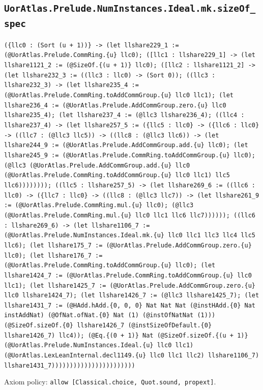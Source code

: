 \documentclass[11pt]{article}
\begin{document}
\subsection*{\texttt{UorAtlas.Prelude.NumInstances.Ideal.mk.sizeOf\_spec}}
\noindent\texttt{(\{llc0 : (Sort (u + 1))\} -> (let llshare229\_1 := (@UorAtlas.Prelude.CommRing.\{u\} llc0); ([llc1 : llshare229\_1] -> (let llshare1121\_2 := (@SizeOf.\{(u + 1)\} llc0); ([llc2 : llshare1121\_2] -> (let llshare232\_3 := ((llc3 : llc0) -> (Sort 0)); ((llc3 : llshare232\_3) -> (let llshare235\_4 := (@UorAtlas.Prelude.CommRing.toAddCommGroup.\{u\} llc0 llc1); (let llshare236\_4 := (@UorAtlas.Prelude.AddCommGroup.zero.\{u\} llc0 llshare235\_4); (let llshare237\_4 := (@llc3 llshare236\_4); ((llc4 : llshare237\_4) -> (let llshare257\_5 := (\{llc5 : llc0\} -> (\{llc6 : llc0\} -> ((llc7 : (@llc3 llc5)) -> ((llc8 : (@llc3 llc6)) -> (let llshare244\_9 := (@UorAtlas.Prelude.AddCommGroup.add.\{u\} llc0); (let llshare245\_9 := (@UorAtlas.Prelude.CommRing.toAddCommGroup.\{u\} llc0); (@llc3 (@UorAtlas.Prelude.AddCommGroup.add.\{u\} llc0 (@UorAtlas.Prelude.CommRing.toAddCommGroup.\{u\} llc0 llc1) llc5 llc6)))))))); ((llc5 : llshare257\_5) -> (let llshare269\_6 := ((llc6 : llc0) -> (\{llc7 : llc0\} -> ((llc8 : (@llc3 llc7)) -> (let llshare261\_9 := (@UorAtlas.Prelude.CommRing.mul.\{u\} llc0); (@llc3 (@UorAtlas.Prelude.CommRing.mul.\{u\} llc0 llc1 llc6 llc7)))))); ((llc6 : llshare269\_6) -> (let llshare1106\_7 := (@UorAtlas.Prelude.NumInstances.Ideal.mk.\{u\} llc0 llc1 llc3 llc4 llc5 llc6); (let llshare175\_7 := (@UorAtlas.Prelude.AddCommGroup.zero.\{u\} llc0); (let llshare176\_7 := (@UorAtlas.Prelude.CommRing.toAddCommGroup.\{u\} llc0); (let llshare1424\_7 := (@UorAtlas.Prelude.CommRing.toAddCommGroup.\{u\} llc0 llc1); (let llshare1425\_7 := (@UorAtlas.Prelude.AddCommGroup.zero.\{u\} llc0 llshare1424\_7); (let llshare1426\_7 := (@llc3 llshare1425\_7); (let llshare1431\_7 := (@HAdd.hAdd.\{0, 0, 0\} Nat Nat Nat (@instHAdd.\{0\} Nat instAddNat) (@OfNat.ofNat.\{0\} Nat (1) (@instOfNatNat (1))) (@SizeOf.sizeOf.\{0\} llshare1426\_7 (@instSizeOfDefault.\{0\} llshare1426\_7) llc4)); (@Eq.\{(0 + 1)\} Nat (@SizeOf.sizeOf.\{(u + 1)\} (@UorAtlas.Prelude.NumInstances.Ideal.\{u\} llc0 llc1) (@UorAtlas.LexLeanInternal.decl1149.\{u\} llc0 llc1 llc2) llshare1106\_7) llshare1431\_7)))))))))))))))))))))))}\par
\noindent Axiom policy: \texttt{allow [Classical.choice, Quot.sound, propext]}.\par
\end{document}
